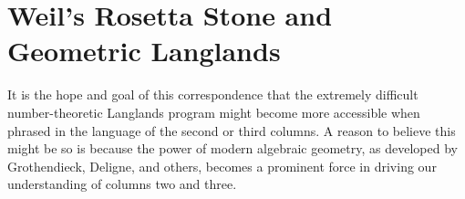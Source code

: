 
\section{Weil's Rosetta Stone and Geometric Langlands} %
\label{sec:weil_s_rosetta_stone_and_geometric_langlands}


It is the hope and goal of this correspondence that the extremely difficult number-theoretic Langlands program might become more accessible when phrased in the language of the second or third columns. A reason to believe this might be so is because the power of modern algebraic geometry, as developed by Grothendieck, Deligne, and others, becomes a prominent force in driving our understanding of columns two and three. 


